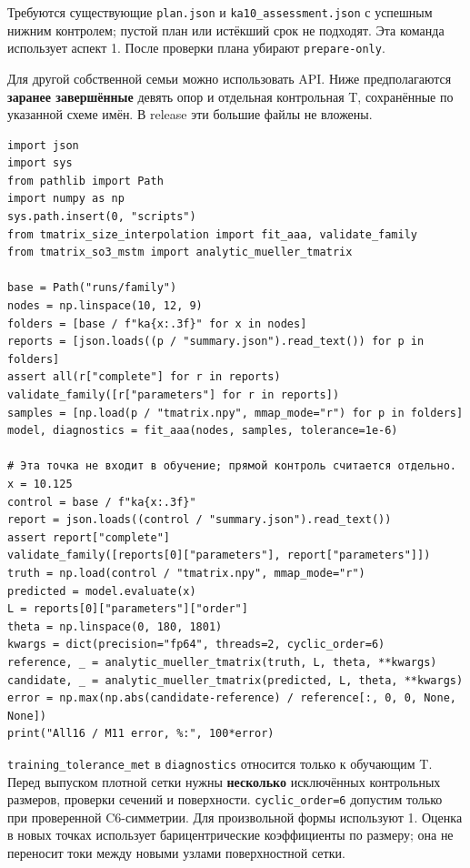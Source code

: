 \documentclass[
  russian,
  11pt,
  a4paper,
]{report}
\begin{document}
Требуются существующие \nolinkurl{plan.json} и
\nolinkurl{ka10_assessment.json} с успешным нижним контролем; пустой
план или истёкший срок не подходят. Эта команда использует аспект 1.
После проверки плана убирают \nolinkurl{prepare-only}.

Для другой собственной семьи можно использовать API. Ниже предполагаются
\textbf{заранее завершённые} девять опор и отдельная контрольная T,
сохранённые по указанной схеме имён. В release эти большие файлы не
вложены.

\begin{verbatim}
import json
import sys
from pathlib import Path
import numpy as np
sys.path.insert(0, "scripts")
from tmatrix_size_interpolation import fit_aaa, validate_family
from tmatrix_so3_mstm import analytic_mueller_tmatrix

base = Path("runs/family")
nodes = np.linspace(10, 12, 9)
folders = [base / f"ka{x:.3f}" for x in nodes]
reports = [json.loads((p / "summary.json").read_text()) for p in folders]
assert all(r["complete"] for r in reports)
validate_family([r["parameters"] for r in reports])
samples = [np.load(p / "tmatrix.npy", mmap_mode="r") for p in folders]
model, diagnostics = fit_aaa(nodes, samples, tolerance=1e-6)

# Эта точка не входит в обучение; прямой контроль считается отдельно.
x = 10.125
control = base / f"ka{x:.3f}"
report = json.loads((control / "summary.json").read_text())
assert report["complete"]
validate_family([reports[0]["parameters"], report["parameters"]])
truth = np.load(control / "tmatrix.npy", mmap_mode="r")
predicted = model.evaluate(x)
L = reports[0]["parameters"]["order"]
theta = np.linspace(0, 180, 1801)
kwargs = dict(precision="fp64", threads=2, cyclic_order=6)
reference, _ = analytic_mueller_tmatrix(truth, L, theta, **kwargs)
candidate, _ = analytic_mueller_tmatrix(predicted, L, theta, **kwargs)
error = np.max(np.abs(candidate-reference) / reference[:, 0, 0, None, None])
print("All16 / M11 error, %:", 100*error)
\end{verbatim}

\nolinkurl{training_tolerance_met} в \nolinkurl{diagnostics} относится
только к обучающим T. Перед выпуском плотной сетки нужны
\textbf{несколько} исключённых контрольных размеров, проверки сечений и
поверхности. \nolinkurl{cyclic_order=6} допустим только при проверенной
C6-симметрии. Для произвольной формы используют 1. Оценка в новых точках
использует барицентрические коэффициенты по размеру; она не переносит
токи между новыми узлами поверхностной сетки.
\end{document}
